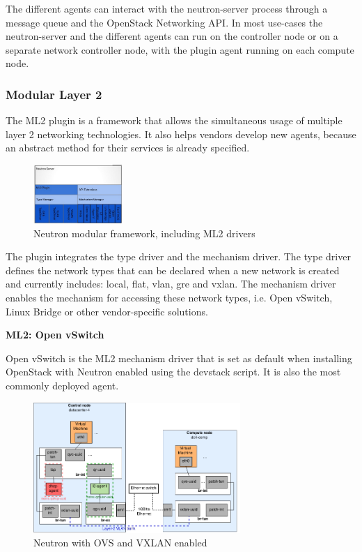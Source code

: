 The different agents can interact with the neutron-server process through a message queue and the OpenStack Networking API. In most use-cases the neutron-server and the different agents can run on the controller node or on a separate network controller node, with the plugin agent running on each compute node.


\subsubsection{Modular Layer 2}

The ML2 plugin is a framework that allows the simultaneous usage of multiple layer 2 networking technologies. It also helps vendors develop new agents, because an abstract method for their services is already specified.

\begin{figure}[H]
\centering
\includegraphics[width=0.3\textwidth]{images/fundamentals/neutron_ml2.png}
\caption{Neutron modular framework, including ML2 drivers}
\end{figure}

The plugin integrates the type driver and the mechanism driver. The type driver defines the network types that can be declared when a new network is created and currently includes: local, flat, vlan, gre and vxlan. The mechanism driver enables the mechanism for accessing these network types, i.e. Open vSwitch, Linux Bridge or other vendor-specific solutions. 



\textbf{ML2: Open vSwitch}

Open vSwitch is the ML2 mechanism driver that is set as default when installing OpenStack with Neutron enabled using the devstack script. It is also the most commonly deployed agent.

\begin{figure}[H]
\centering
\includegraphics[width=0.7\textwidth]{images/fundamentals/neutron_ovs_bridges.png}
\caption{Neutron with OVS and VXLAN enabled}
\end{figure}

